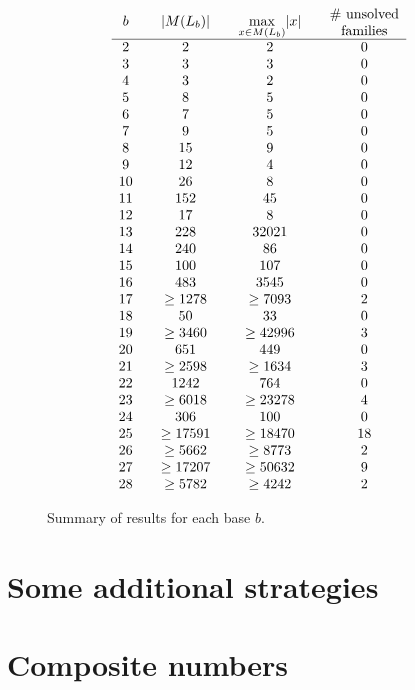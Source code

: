 \documentclass[12pt]{article}
\theoremstyle{plain}
\theoremstyle{definition}
\theoremstyle{remark}
\begin{document}
\begin{figure}\[\begin{array}{c@{\qquad}c@{\qquad}c@{\qquad}c}
b & \lvert M(L_b)\rvert & \max\limits_{x\in M(L_b)}\lvert x\rvert & \parbox{5em}{\centering\# unsolved\\families} \\ \hline
2 & 2 & 2 & 0 \\ 
3 & 3 & 3 & 0 \\ 
4 & 3 & 2 & 0 \\ 
5 & 8 & 5 & 0 \\ 
6 & 7 & 5 & 0 \\ 
7 & 9 & 5 & 0 \\ 
8 & 15 & 9 & 0 \\ 
9 & 12 & 4 & 0 \\ 
10 & 26 & 8 & 0 \\ 
11 & 152 & 45 & 0 \\ 
12 & 17 & 8 & 0 \\ 
13 & 228 & 32021 & 0 \\ 
14 & 240 & 86 & 0 \\ 
15 & 100 & 107 & 0 \\ 
16 & 483 & 3545 & 0 \\ 
17 & \geq1278 & \geq7093 & 2 \\ 
18 & 50 & 33 & 0 \\ 
19 & \geq3460 & \geq42996 & 3 \\ 
20 & 651 & 449 & 0 \\ 
21 & \geq2598 & \geq1634 & 3 \\ 
22 & 1242 & 764 & 0 \\ 
23 & \geq6018 & \geq23278 & 4 \\ 
24 & 306 & 100 & 0 \\ 
25 & \geq17591 & \geq18470 & 18 \\ 
26 & \geq5662 & \geq8773 & 2 \\ 
27 & \geq17207 & \geq50632 & 9 \\ 
28 & \geq5782 & \geq4242 & 2 
\end{array}\]
\caption{Summary of results for each base $b$.}
\label{resultsfig}
\end{figure}

\section{Some additional strategies}

\section{Composite numbers}
\end{document}
